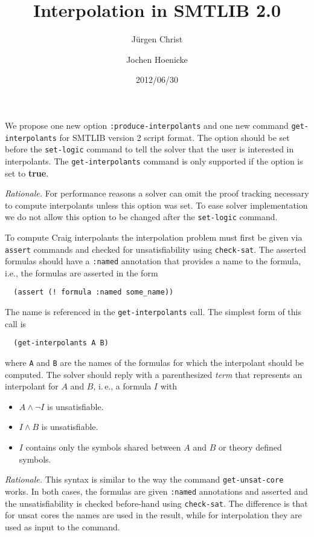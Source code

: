 \documentclass[a4paper,12pt]{article}
\title{Interpolation in SMTLIB 2.0}
\author{J{\"u}rgen Christ \and Jochen Hoenicke}
\date{2012/06/30}
\begin{document}
\maketitle

We propose one new option \texttt{:produce-interpolants} and one new
command \texttt{get-interpolants} for SMTLIB version 2 script format.
The option should be set before the \texttt{set-logic} command to tell
the solver that the user is interested in interpolants.  The
\texttt{get-interpolants} command is only supported if the option is
set to \textbf{true}. 

\emph{Rationale.} For performance reasons a solver can omit the proof
tracking necessary to compute interpolants unless this option was set.
To ease solver implementation we do not allow this option to be
changed after the \texttt{set-logic} command.

To compute Craig interpolants the interpolation problem must first be
given via \texttt{assert} commands and checked for unsatisfiability
using \texttt{check-sat}.  The asserted formulas should have a
\texttt{:named} annotation that provides a name to the formula, i.e., 
the formulas are asserted in the form
\begin{verbatim}
  (assert (! formula :named some_name))
\end{verbatim}
The name is referenced in the \texttt{get-interpolants} call.  
%
The simplest form of this call is
\begin{verbatim}
  (get-interpolants A B)
\end{verbatim}
where \texttt{A} and \texttt{B} are the names of the formulas for which
the interpolant should be computed.  The solver should reply with a
parenthesized \emph{term} that represents an interpolant for $A$ and
$B$, i.\,e., a formula $I$ with
\begin{itemize}
\item $A \land \lnot I$ is unsatisfiable.
\item $I \land B$ is unsatisfiable.
\item $I$ contains only the symbols shared between $A$ and $B$ or
  theory defined symbols.
\end{itemize}

\emph{Rationale.} This syntax is similar to the way the command
\texttt{get-unsat-core} works.  In both cases, the formulas are given
\texttt{:named} annotations and asserted and the unsatisfiability is
checked before-hand using \texttt{check-sat}.  The difference is that
for unsat cores the names are used in the result, while for
interpolation they are used as input to the command.
\end{document}
